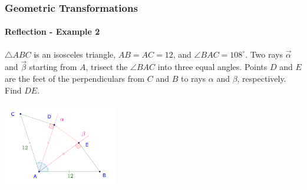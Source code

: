\documentclass[8pt,xcolor=table,dvipsnames]{beamer}
\newcommand{\dg}{^\circ}
\begin{document}
\begin{frame}[t]
    \frametitle{Geometric Transformations}
    \framesubtitle{Reflection - Example 2}
    \begin{example}
        $\triangle ABC$ is an isosceles triangle, $AB=AC=12$, and $\angle BAC= 108\dg$. 
        Two rays $\overrightarrow{\alpha}$ and $\overrightarrow{\beta}$ starting from $A$, 
        trisect the $\angle BAC$ into three equal angles.
        Points $D$ and $E$ are the feet of the perpendiculars from $C$ and $B$ to rays $\alpha$ and $\beta$, respectively.
        Find $DE$.
    \end{example}
    \begin{center}
        \includegraphics[width=5cm]{./svg/pdf/hc-2021-sm2-s1-p6-3.pdf}
    \end{center}
\end{frame}
\end{document}

